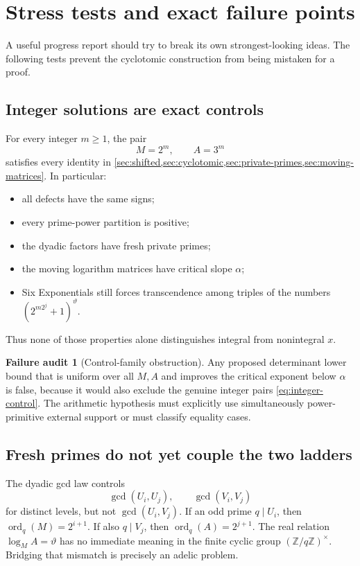 \documentclass[11pt]{article}
\theoremstyle{definition}
\newtheorem{audit}[theorem]{Failure audit}
\newcommand{\Z}{\mathbb Z}
\newcommand{\ord}{\operatorname{ord}}
\newcommand{\vtheta}{\vartheta}
\begin{document}
\section{Stress tests and exact failure points}\label{sec:stress-tests}

A useful progress report should try to break its own strongest-looking ideas.  The
following tests prevent the cyclotomic construction from being mistaken for a proof.

\subsection{Integer solutions are exact controls}

For every integer $m\ge1$, the pair
\begin{equation}\label{eq:integer-control}
 M=2^m,
 \qquad A=3^m
\end{equation}
satisfies every identity in \cref{sec:shifted,sec:cyclotomic,sec:private-primes,sec:moving-matrices}.
In particular:
\begin{itemize}
\item all defects have the same signs;
\item every prime-power partition is positive;
\item the dyadic factors have fresh private primes;
\item the moving logarithm matrices have critical slope $\alpha$;
\item Six Exponentials still forces transcendence among triples of the numbers
$(2^{m2^j}+1)^{\vtheta}$.
\end{itemize}
Thus none of those properties alone distinguishes integral from nonintegral $x$.

\begin{audit}[Control-family obstruction]
Any proposed determinant lower bound that is uniform over all $M,A$ and improves the
critical exponent below $\alpha$ is false, because it would also exclude the genuine
integer pairs \eqref{eq:integer-control}.  The arithmetic hypothesis must explicitly use
simultaneously power-primitive external support or must classify equality cases.
\end{audit}

\subsection{Fresh primes do not yet couple the two ladders}

The dyadic gcd law controls
\[
 \gcd(U_i,U_j),\qquad \gcd(V_i,V_j)
\]
for distinct levels, but not $\gcd(U_i,V_j)$.  If an odd prime $q\mid U_i$, then
$\ord_q(M)=2^{i+1}$.  If also $q\mid V_j$, then
$\ord_q(A)=2^{j+1}$.  The real relation
$\log_M A=\vtheta$ has no immediate meaning in the finite cyclic group
$(\Z/q\Z)^\times$.  Bridging that mismatch is precisely an adelic problem.
\end{document}
